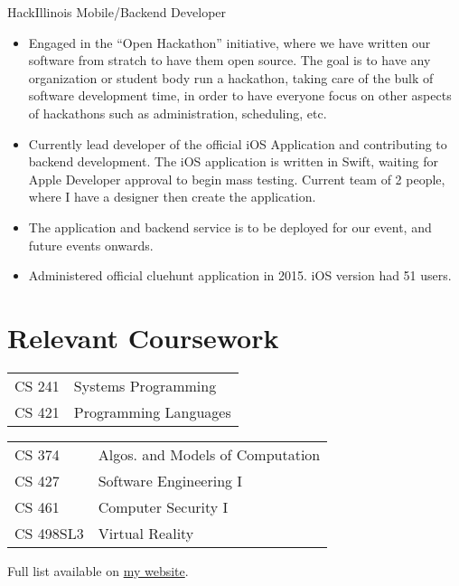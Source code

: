 \documentclass{tccv}
\begin{document}
\begin{eventlist}
  {HackIllinois}
  {Mobile/Backend Developer}
  \begin{itemize}
  \item Engaged in the ``Open Hackathon'' initiative, where we have written our software from stratch to have them open source. The goal is to have any organization or student body run a hackathon, taking care of the bulk of software development time, in order to have everyone focus on other aspects of hackathons such as administration, scheduling, etc.
  \item Currently lead developer of the official iOS Application and contributing to \\
    backend development. The iOS application is written in Swift, waiting for Apple Developer approval to begin mass testing. Current team of 2 people, where I have a designer then create the application.
  \item The application and backend service is to be deployed for our event, and future events onwards.
  \item Administered official cluehunt application in 2015. iOS version had 51 users.
  \end{itemize}

\end{eventlist}

\section{Relevant Coursework}
\begin{courselist}

  \begin{tabular}{l l}
    CS 241 & Systems Programming \\
    CS 421 & Programming Languages \\
  \end{tabular}

  \begin{tabular}{l l}
    CS 374 & Algos. and Models of Computation \\
    CS 427 & Software Engineering I \\
    CS 461 & Computer Security I \\
    CS 498SL3 & Virtual Reality \\
  \end{tabular}
  \forceskip
  Full list available on \href{https://shotaroikeda.github.io/}{my website}.

\end{courselist}
\end{document}
